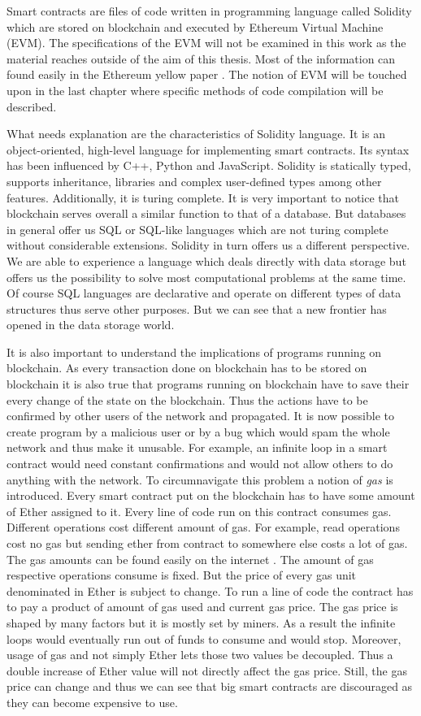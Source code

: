 \documentclass[a4paper,12pt,twoside,openany]{report}
\begin{document}
Smart contracts are files of code written in programming language called Solidity which are stored on blockchain and executed by Ethereum Virtual Machine (EVM). The specifications of the EVM will not be examined in this work as the material reaches outside of the aim of this thesis. Most of the information can found easily in the Ethereum yellow paper \cite{ethyellow}.  The notion of EVM will be touched upon in the last chapter where specific methods of code compilation will be described.

What needs explanation are the characteristics of Solidity language. It is an object-oriented, high-level language for implementing smart contracts. Its syntax has been influenced by C++, Python and JavaScript. Solidity is statically typed, supports inheritance, libraries and complex user-defined types among other features. Additionally, it is turing complete. It is very important to notice that blockchain serves overall a similar function to that of a database. But databases in general offer us SQL or SQL-like languages which are not turing complete without considerable extensions. Solidity in turn offers us a different perspective. We are able to experience a language which deals directly with data storage but offers us the possibility to solve most computational problems at the same time. Of course SQL languages are declarative and operate on different types of data structures thus serve other purposes. But we can see that a new frontier has opened in the data storage world.

It is also important to understand the implications of programs running on blockchain. As every transaction done on blockchain has to be stored on blockchain it is also true that programs running on blockchain have to save their every change of the state on the blockchain. Thus the actions have to be confirmed by other users of the network and propagated. It is now possible to create program by a malicious user or by a bug which would spam the whole network and thus make it unusable. For example, an infinite loop in a smart contract would need constant confirmations and would not allow others to do anything with the network. To circumnavigate this problem a notion of \textit{gas} is introduced. Every smart contract put on the blockchain has to have some amount of Ether assigned to it. Every line of code run on this contract consumes gas. Different operations cost different amount of gas. For example, read operations cost no gas but sending ether from contract to somewhere else costs a lot of gas. The gas amounts can be found easily on the internet \cite{gas}.  The amount of gas respective operations consume is fixed. But the price of every gas unit denominated in Ether is subject to change. To run a line of code the contract has to pay a product of amount of gas used and current gas price. The gas price is shaped by many factors but it is mostly set by miners. As a result the infinite loops would eventually run out of funds to consume and would stop. Moreover, usage of gas and not simply Ether lets those two values be decoupled. Thus a double increase of Ether value will not directly affect the gas price. Still, the gas price can change and thus we can see that big smart contracts are discouraged as they can become expensive to use. 
\end{document}
